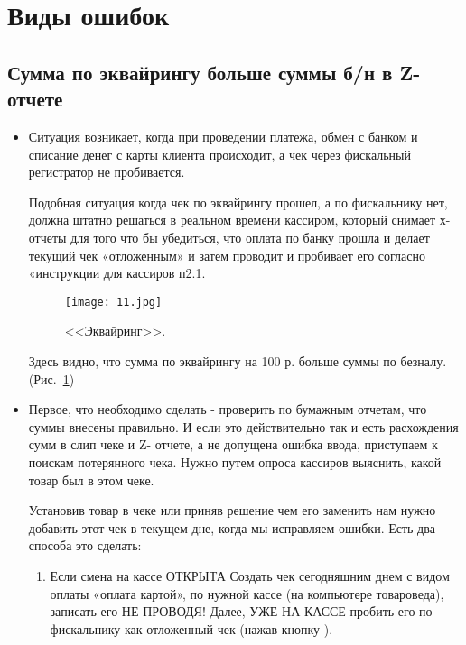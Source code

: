 \section{Виды ошибок}\label{5000}
\subsection{Сумма по эквайрингу больше суммы б/н в Z-отчете}

\begin{itemize}	
	\item Ситуация возникает, когда при проведении платежа, обмен с банком и списание денег с карты клиента происходит, а чек через фискальный регистратор не пробивается.
	
	
	\begin{myquote}
		Подобная ситуация когда чек по эквайрингу прошел, а по фискальнику нет, должна штатно решаться в реальном времени кассиром, который снимает х-отчеты для того что бы убедиться, что оплата по банку прошла и делает текущий чек «отложенным» и затем проводит и пробивает его согласно «инструкции для кассиров п2.1.
	\end{myquote}
	
	
	\begin{figure}[H]
		\texttt{[image: 11.jpg]}
		\caption{<<Эквайринг>>.}
		\label{ris:11.jpg}
	\end{figure}
	Здесь видно, что сумма по эквайрингу на 100 р. больше суммы по безналу.  (Рис.~\ref{ris:11.jpg})
	\item Первое, что необходимо сделать - проверить по бумажным отчетам, что суммы внесены правильно. И если это действительно так и есть расхождения сумм  в слип чеке и Z- отчете, а не допущена ошибка ввода, приступаем к поискам потерянного чека. Нужно путем опроса кассиров выяснить, какой товар был в этом чеке.
    
    
	Установив товар в чеке или приняв решение чем его заменить нам нужно добавить этот чек в текущем дне, когда мы исправляем ошибки. Есть два способа это сделать:	
	
	\begin{enumerate}[label={\Alph*)},font={\color{blue!50!black}\bfseries}] 
		\item Если смена на кассе ОТКРЫТА Создать чек сегодняшним днем с видом оплаты «оплата картой», по нужной кассе (на компьютере  товароведа), записать его НЕ ПРОВОДЯ!  Далее, УЖЕ НА КАССЕ пробить его по фискальнику как отложенный чек (нажав кнопку ).
		

\end{enumerate}
\end{itemize}
